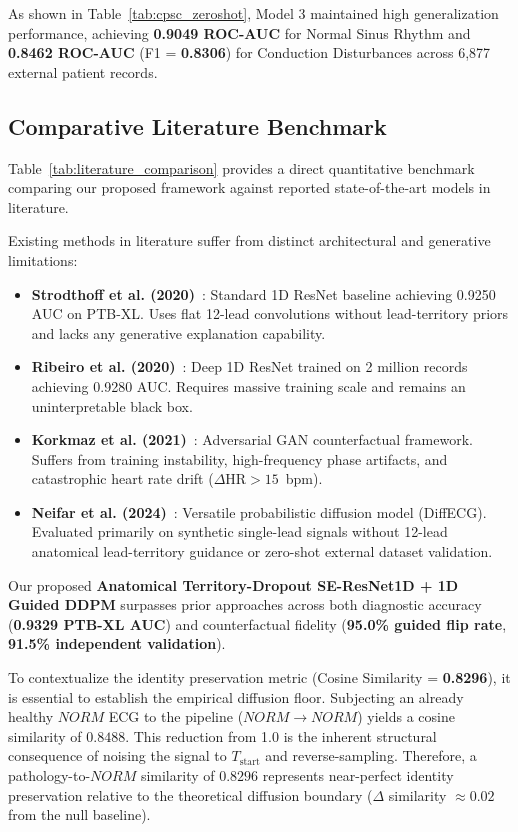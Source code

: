\documentclass[5p,twocolumn,10pt]{elsarticle}
\begin{document}
As shown in Table~\ref{tab:cpsc_zeroshot}, Model 3 maintained high generalization performance, achieving \textbf{0.9049 ROC-AUC} for Normal Sinus Rhythm and \textbf{0.8462 ROC-AUC} (F1 = \textbf{0.8306}) for Conduction Disturbances across 6,877 external patient records.

\subsection{Comparative Literature Benchmark}
Table~\ref{tab:literature_comparison} provides a direct quantitative benchmark comparing our proposed framework against reported state-of-the-art models in literature.

Existing methods in literature suffer from distinct architectural and generative limitations:
\begin{itemize}
    \item \textbf{Strodthoff et al. (2020)}~\cite{strodthoff2020deep}: Standard 1D ResNet baseline achieving 0.9250 AUC on PTB-XL. Uses flat 12-lead convolutions without lead-territory priors and lacks any generative explanation capability.
    \item \textbf{Ribeiro et al. (2020)}~\cite{ribeiro2020automatic}: Deep 1D ResNet trained on 2 million records achieving 0.9280 AUC. Requires massive training scale and remains an uninterpretable black box.
    \item \textbf{Korkmaz et al. (2021)}~\cite{korkmaz2021deep}: Adversarial GAN counterfactual framework. Suffers from training instability, high-frequency phase artifacts, and catastrophic heart rate drift ($\Delta\text{HR} > 15$~bpm).
    \item \textbf{Neifar et al. (2024)}~\cite{neifar2024diffecg}: Versatile probabilistic diffusion model (DiffECG). Evaluated primarily on synthetic single-lead signals without 12-lead anatomical lead-territory guidance or zero-shot external dataset validation.
\end{itemize}

Our proposed \textbf{Anatomical Territory-Dropout SE-ResNet1D + 1D Guided DDPM} surpasses prior approaches across both diagnostic accuracy (\textbf{0.9329 PTB-XL AUC}) and counterfactual fidelity (\textbf{95.0\% guided flip rate}, \textbf{91.5\% independent validation}). 

To contextualize the identity preservation metric (Cosine Similarity = \textbf{0.8296}), it is essential to establish the empirical diffusion floor. Subjecting an already healthy $NORM$ ECG to the pipeline ($NORM \to NORM$) yields a cosine similarity of $0.8488$. This reduction from 1.0 is the inherent structural consequence of noising the signal to $T_{\text{start}}$ and reverse-sampling. Therefore, a pathology-to-$NORM$ similarity of $0.8296$ represents near-perfect identity preservation relative to the theoretical diffusion boundary ($\Delta$ similarity $\approx 0.02$ from the null baseline).
\end{document}
